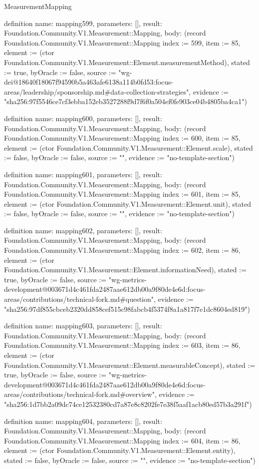 \begin{lexlean}{MeasurementMapping}
\begin{semanticmodule}
definition{
  name: mapping599,
  parameters: [],
  result: Foundation.Community.V1.Measurement::Mapping,
  body: (record Foundation.Community.V1.Measurement::Mapping {index := 599, item := 85, element := (ctor Foundation.Community.V1.Measurement::Element.measurementMethod), stated := true, byOracle := false, source := "wg-dei@18640f18067f94590b5a463afe6138a114b0fd53:focus-areas/leadership/sponsorship.md#data-collection-strategies", evidence := "sha256:97f5546ce7cf3ebba152eb3527288f9d7f6f0a504ef0fe903ce04b4805ba4ca1"})
}

definition{
  name: mapping600,
  parameters: [],
  result: Foundation.Community.V1.Measurement::Mapping,
  body: (record Foundation.Community.V1.Measurement::Mapping {index := 600, item := 85, element := (ctor Foundation.Community.V1.Measurement::Element.scale), stated := false, byOracle := false, source := "", evidence := "no-template-section"})
}

definition{
  name: mapping601,
  parameters: [],
  result: Foundation.Community.V1.Measurement::Mapping,
  body: (record Foundation.Community.V1.Measurement::Mapping {index := 601, item := 85, element := (ctor Foundation.Community.V1.Measurement::Element.unit), stated := false, byOracle := false, source := "", evidence := "no-template-section"})
}

definition{
  name: mapping602,
  parameters: [],
  result: Foundation.Community.V1.Measurement::Mapping,
  body: (record Foundation.Community.V1.Measurement::Mapping {index := 602, item := 86, element := (ctor Foundation.Community.V1.Measurement::Element.informationNeed), stated := true, byOracle := false, source := "wg-metrics-development@003671d4c461fda2487aae612db00a9f80de4e6d:focus-areas/contributions/technical-fork.md#question", evidence := "sha256:97df855cbceb2320dd858cef515c98fabcb4f5374f8a1a817f7e1dc8604ed819"})
}

definition{
  name: mapping603,
  parameters: [],
  result: Foundation.Community.V1.Measurement::Mapping,
  body: (record Foundation.Community.V1.Measurement::Mapping {index := 603, item := 86, element := (ctor Foundation.Community.V1.Measurement::Element.measurableConcept), stated := true, byOracle := false, source := "wg-metrics-development@003671d4c461fda2487aae612db00a9f80de4e6d:focus-areas/contributions/technical-fork.md#overview", evidence := "sha256:1d7bb2a09dc74ce12532380cd7a87e8c8202fe7e38f5aaf1acb80ed57b3a291f"})
}

definition{
  name: mapping604,
  parameters: [],
  result: Foundation.Community.V1.Measurement::Mapping,
  body: (record Foundation.Community.V1.Measurement::Mapping {index := 604, item := 86, element := (ctor Foundation.Community.V1.Measurement::Element.entity), stated := false, byOracle := false, source := "", evidence := "no-template-section"})
}


\end{semanticmodule}
\end{lexlean}
